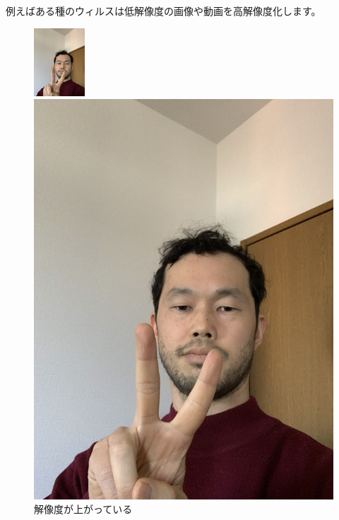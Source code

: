 \documentclass[12pt, unicode]{beamer}
\begin{document}
\begin{frame}

例えばある種のウィルスは低解像度の画像や動画を高解像度化します。

\begin{figure}[htbp]
  \begin{minipage}[b]{0.4\linewidth}
    \centering
    \includegraphics[keepaspectratio, scale=1.2]{pic1_resize.jpg}
  \end{minipage}
  \begin{minipage}[b]{0.18\linewidth}
  \end{minipage}
  \begin{minipage}[b]{0.4\linewidth}
    \centering
    \includegraphics[keepaspectratio, scale=0.15]{pic1.jpg}
  \end{minipage}
  \caption{解像度が上がっている}
\end{figure}

\end{frame}
\end{document}
